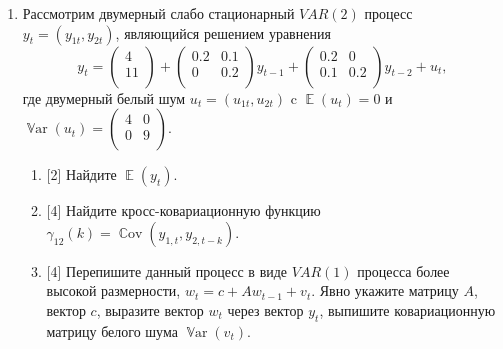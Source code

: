 \documentclass[12pt]{article}
\DeclareMathOperator{\Cov}{\mathbb{C}ov}
\DeclareMathOperator{\Var}{\mathbb{V}ar}
\DeclareMathOperator{\E}{\mathbb{E}}
\begin{document}
\begin{enumerate}
    \item Рассмотрим двумерный слабо стационарный $VAR(2)$ процесс $y_t = (y_{1t}, y_{2t})$, являющийся решением уравнения
    \[
    y_t = \begin{pmatrix}
    4 \\ 
    11 \\    
    \end{pmatrix} + 
    \begin{pmatrix}
      0.2  & 0.1 \\
      0  & 0.2 \\
    \end{pmatrix} y_{t-1} + 
    \begin{pmatrix}
      0.2  & 0 \\
      0.1  & 0.2 \\
    \end{pmatrix} y_{t-2} + u_t,
    \]
    где двумерный белый шум $u_t = (u_{1t}, u_{2t})$ c $\E(u_t) = 0$ и $\Var(u_t) = \begin{pmatrix}
        4 & 0 \\
        0 & 9 \\
    \end{pmatrix}$.
    \begin{enumerate}
        \item {[2]} Найдите $\E(y_t)$.
        \item {[4]} Найдите кросс-ковариационную функцию $\gamma_{12}(k) = \Cov(y_{1,t}, y_{2, t-k})$. 
        \item {[4]} Перепишите данный процесс в виде $VAR(1)$ процесса более высокой размерности, $w_t = c + A w_{t-1} + v_t$.
        Явно укажите матрицу $A$, вектор $c$, выразите вектор $w_t$ через вектор $y_t$, выпишите ковариационную матрицу белого шума $\Var(v_t)$.
    \end{enumerate}

\end{enumerate}
\end{document}
